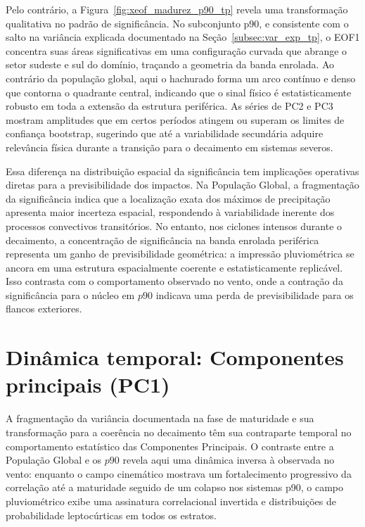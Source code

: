 Pelo contrário, a Figura~\ref{fig:xeof_madurez_p90_tp} revela uma transformação qualitativa no padrão de significância.
No subconjunto p90, e consistente com o salto na variância explicada documentado na Seção~\ref{subsec:var_exp_tp}, o EOF1 concentra suas áreas significativas em uma configuração curvada que abrange o setor sudeste e sul do domínio, traçando a geometria da banda enrolada.
Ao contrário da população global, aqui o hachurado forma um arco contínuo e denso que contorna o quadrante central, indicando que o sinal físico é estatisticamente robusto em toda a extensão da estrutura periférica.
As séries de PC2 e PC3 mostram amplitudes que em certos períodos atingem ou superam os limites de confiança bootstrap, sugerindo que até a variabilidade secundária adquire relevância física durante a transição para o decaimento em sistemas severos.

Essa diferença na distribuição espacial da significância tem implicações operativas diretas para a previsibilidade dos impactos.
Na População Global, a fragmentação da significância indica que a localização exata dos máximos de precipitação apresenta maior incerteza espacial, respondendo à variabilidade inerente dos processos convectivos transitórios.
No entanto, nos ciclones intensos durante o decaimento, a concentração de significância na banda enrolada periférica representa um ganho de previsibilidade geométrica: a impressão pluviométrica se ancora em uma estrutura espacialmente coerente e estatisticamente replicável.
Isso contrasta com o comportamento observado no vento, onde a contração da significância para o núcleo em $p90$ indicava uma perda de previsibilidade para os flancos exteriores.

\section{Dinâmica temporal: Componentes principais (PC1)}\label{sec:dinamica_pc1_tp}

A fragmentação da variância documentada na fase de maturidade e sua transformação para a coerência no decaimento têm sua contraparte temporal no comportamento estatístico das Componentes Principais.
O contraste entre a População Global e os $p90$ revela aqui uma dinâmica inversa à observada no vento: enquanto o campo cinemático mostrava um fortalecimento progressivo da correlação até a maturidade seguido de um colapso nos sistemas p90, o campo pluviométrico exibe uma assinatura correlacional invertida e distribuições de probabilidade leptocúrticas em todos os estratos.

